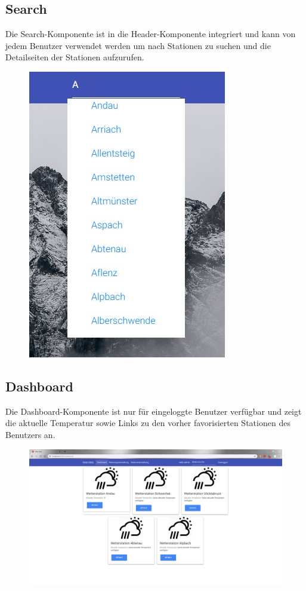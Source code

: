 \documentclass[10pt,a4paper,margin=0pt]{scrartcl}
\begin{document}
\subsection{Search}
Die Search-Komponente ist in die Header-Komponente integriert und kann von jedem Benutzer verwendet werden um nach Stationen zu suchen und die Detailseiten der Stationen aufzurufen.
\begin{figure}[H]
\includegraphics[scale=0.5]{./img/suche.jpg}
\centering
\end{figure}
\subsection{Dashboard}
Die Dashboard-Komponente ist nur für eingeloggte Benutzer verfügbar und zeigt die aktuelle Temperatur sowie Links zu den vorher favorisierten Stationen des Benutzers an.
\begin{figure}[H]
\includegraphics[width=\textwidth]{./img/dashboard.jpg}
\centering
\end{figure}
\end{document}
